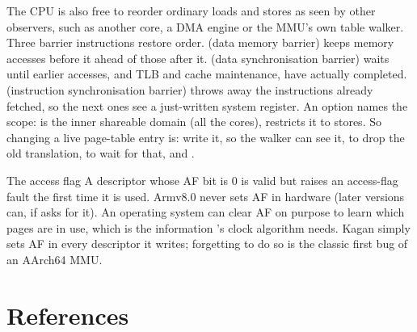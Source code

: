 \documentclass[11pt,a4paper]{article}
\begin{document}
The CPU is also free to reorder ordinary loads and stores as seen by other observers, such as another core, a DMA
engine or the MMU's own table walker. Three barrier instructions restore order.  (data memory barrier)
keeps memory accesses before it ahead of those after it.  (data synchronisation barrier) waits until earlier
accesses, and TLB and cache maintenance, have actually completed.  (instruction synchronisation barrier)
throws away the instructions already fetched, so the next ones see a just-written system register. An option names
the scope:  is the inner shareable domain (all the cores),  restricts it to stores. So changing a
live page-table entry is: write it,  so the walker can see it,  to drop the old
translation,  to wait for that, and .

\begin{conceptbox}{The access flag}
A descriptor whose AF bit is 0 is valid but raises an access-flag fault the first time it is used. Armv8.0 never sets
AF in hardware (later versions can, if  asks for it). An operating system can clear AF on purpose to
learn which pages are in use, which is the information \OSTEP's clock algorithm needs. Kagan simply sets AF in every
descriptor it writes; forgetting to do so is the classic first bug of an AArch64 MMU.
\end{conceptbox}

\section{References}
\end{document}
